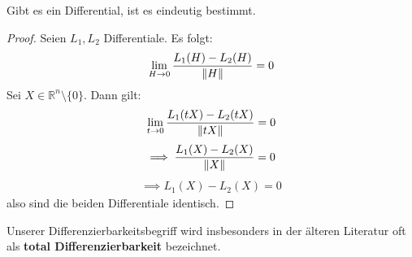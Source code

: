 \documentclass{report}
\newcommand{\tbf}[1]{\textbf{#1}}
\newcommand{\bR}{\mathbb{R}}
\begin{document}
\begin{theorem}
 Gibt es ein Differential, ist es eindeutig bestimmt.
\end{theorem}
\begin{proof}
 Seien $L_1, L_2$ Differentiale. Es folgt:
 \begin{align*}
  \lim_{H \to 0} \frac{L_1(H) - L_2(H)}{\norm{H}} = 0
 \end{align*}
 Sei $X \in \bR^n \setminus \{0\}$. Dann gilt:
 \begin{align*}
  \lim_{t \to 0} \frac{L_1(tX) - L_2(tX)}{\norm{tX}} = 0
 \end{align*}
 \begin{align*}
  \implies \frac{L_1(X) - L_2(X)}{\norm{X}} = 0
 \end{align*}
 \begin{align*}
  \implies L_1(X) - L_2(X) = 0
 \end{align*}
 also sind die beiden Differentiale identisch.
\end{proof}
\begin{anmerkung}
 Unserer Differenzierbarkeitsbegriff wird insbesonders in der älteren Literatur oft als \tbf{total Differenzierbarkeit} bezeichnet.
\end{anmerkung}

%
%
%
%
%
%
%
%
%
%
%
%
%
%
%
%
%
\end{document}
